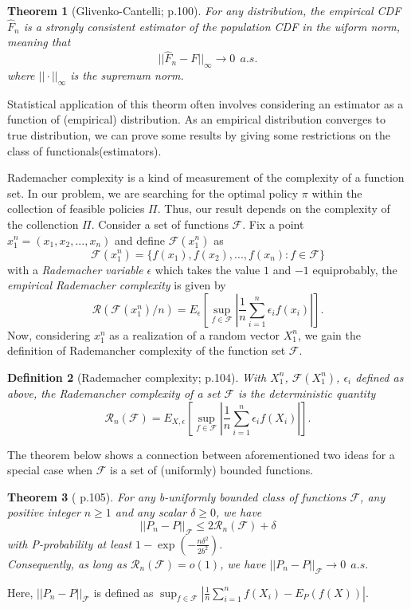 \documentclass[11pt]{article}
\newtheorem{theorem}{Theorem}
\newtheorem{definition}[theorem]{Definition}
\begin{document}
	\begin{theorem}[Glivenko-Cantelli;\cite{wainwright2019high} p.100]
		For any distribution, the empirical CDF $\hat{F}_n$ is a strongly consistent estimator of the population CDF in the uiform norm, meaning that
		$$
		|| \hat{F}_n - F ||_{\infty} \rightarrow 0 ~~a.s.
		$$
		where $||\cdot||_{\infty}$ is the supremum norm. 
	\end{theorem}
	Statistical application of this theorm often involves considering an estimator as a function of (empirical) distribution. As an empirical distribution converges to true distribution, we can prove some results by giving some restrictions on the class of functionals(estimators).
	
	Rademacher complexity is a kind of measurement of the complexity of a function set. In our problem, we are searching for the optimal policy $\pi$ within the collection of feasible policies $\Pi$. Thus, our result depends on the complexity of the collenction $\Pi$. Consider a set of functions $\mathcal{F}$. Fix a point $x_1^n = (x_1, x_2, ..., x_n)$ and define $\mathcal{F}(x_1^n)$ as
	$$
	\mathcal{F}(x_1^n) = \{f(x_1), f(x_2), ..., f(x_n) : f \in \mathcal{F} \}
	$$
	with a \textit{Rademacher variable} $\epsilon$ which takes the value $1$ and $-1$ equiprobably, the \textit{empirical Rademacher complexity} is given by
	$$
	\mathcal{R}(\mathcal{F}(x_1^n)/n) = E_{\epsilon}\left[\sup_{f\in\mathcal{F}} \left| \frac{1}{n} \sum_{i=1}^n \epsilon_i f(x_i)\right| \right].
	$$
	Now, considering $x_1^n$ as a realization of a random vector $X_1^n$, we gain the definition of Rademancher complexity of the function set $\mathcal{F}$.
	
	\begin{definition}[Rademacher complexity; \cite{wainwright2019high} p.104]
		With $X_1^n$, $\mathcal{F}(X_1^n)$, $\epsilon_i$ defined as above, the Rademancher complexity of a set $\mathcal{F}$ is the deterministic quantity
		$$
		\mathcal{R}_n(\mathcal{F})
		=
		E_{X,\epsilon}\left[ 
		\sup_{f \in \mathcal{F}} \left|
		\frac{1}{n} \sum_{i=1}^n \epsilon_i f(X_i)
		\right|
		\right].
		$$
	\end{definition}
	
	The theorem below shows a connection between aforementioned two ideas for a special case when $\mathcal{F}$ is a set of (uniformly) bounded functions.
	
	\begin{theorem}[\cite{wainwright2019high} p.105]
		For any b-uniformly bounded class of functions $\mathcal{F}$, any positive integer $n \geq 1$ and any scalar $\delta \geq 0$, we have
		$$
		|| P_n - P||_{\mathcal{F}} \leq
		2 \mathcal{R}_n(\mathcal{F}) + \delta
		$$
		with P-probability at least $1-\exp(- \frac{n\delta^2}{2b^2})$.\\ Consequently, as long as $\mathcal{R}_n(\mathcal{F})=o(1)$, we have $||P_n - P||_{\mathcal{F}} \rightarrow 0 ~~a.s.$ 
	\end{theorem}
Here, $||P_n-P||_{\mathcal{F}}$ is defined as $\sup_{f \in \mathcal{F}} \left| \frac{1}{n} \sum_{i=1}^n f(X_i) - E_{P}(f(X))\right|$.
\end{document}
